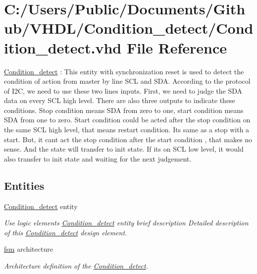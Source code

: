 \hypertarget{_condition__detect_8vhd}{}\section{C\+:/\+Users/\+Public/\+Documents/\+Github/\+V\+H\+D\+L/\+Condition\+\_\+detect/\+Condition\+\_\+detect.vhd File Reference}
\label{_condition__detect_8vhd}


\hyperlink{class_condition__detect}{Condition\+\_\+detect} \+: This entity with synchronization reset is used to detect the condition of action from master by line S\+CL and S\+DA. According to the protocol of I2C, we need to use these two lines inputs. First, we need to judge the S\+DA data on every S\+CL high level. There are also three outputs to indicate these conditions. Stop condition means S\+DA from zero to one, start condition means S\+DA from one to zero. Start condition could be acted after the stop condition on the same S\+CL high level, that means restart condition. It\textquotesingle{}s same as a stop with a start. But, it can\textquotesingle{}t act the stop condition after the start condition , that makes no sense. And the state will transfer to init state. If it\textquotesingle{}s on S\+CL low level, it would also transfer to init state and waiting for the next judgement.  


\subsection*{Entities}
\begin{DoxyCompactItemize}
\item 
\hyperlink{class_condition__detect}{Condition\+\_\+detect} entity
\begin{DoxyCompactList}\small\item\em Use logic elements \hyperlink{class_condition__detect}{Condition\+\_\+detect} entity brief description Detailed description of this \hyperlink{class_condition__detect}{Condition\+\_\+detect} design element. \end{DoxyCompactList}\item 
\hyperlink{class_condition__detect_1_1fsm}{fsm} architecture
\begin{DoxyCompactList}\small\item\em Architecture definition of the \hyperlink{class_condition__detect}{Condition\+\_\+detect}. \end{DoxyCompactList}\end{DoxyCompactItemize}


